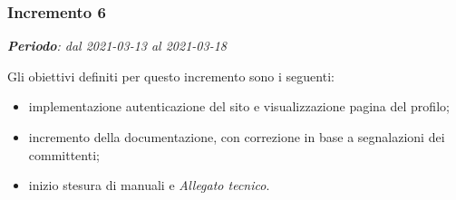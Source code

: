 \subsubsection{Incremento 6}
\textit{\textbf{Periodo}: dal 2021-03-13 al 2021-03-18}

Gli obiettivi definiti per questo incremento sono i seguenti:
\begin{itemize}
\item implementazione autenticazione del sito e visualizzazione pagina del profilo;
\item incremento della documentazione, con correzione in base a segnalazioni dei committenti;
\item inizio stesura di manuali e \textit{Allegato tecnico}.
\end{itemize}

